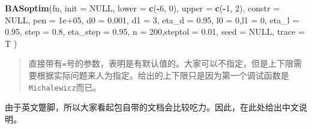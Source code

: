 \documentclass[]{ctexbook}
\newenvironment{Shaded}{\begin{snugshade}}{\end{snugshade}}
\newcommand{\KeywordTok}[1]{\textcolor[rgb]{0.13,0.29,0.53}{\textbf{#1}}}
\newcommand{\DataTypeTok}[1]{\textcolor[rgb]{0.13,0.29,0.53}{#1}}
\newcommand{\DecValTok}[1]{\textcolor[rgb]{0.00,0.00,0.81}{#1}}
\newcommand{\FloatTok}[1]{\textcolor[rgb]{0.00,0.00,0.81}{#1}}
\newcommand{\OtherTok}[1]{\textcolor[rgb]{0.56,0.35,0.01}{#1}}
\newcommand{\OperatorTok}[1]{\textcolor[rgb]{0.81,0.36,0.00}{\textbf{#1}}}
\newcommand{\NormalTok}[1]{#1}
\begin{document}
\begin{Shaded}
\begin{Highlighting}[]
\KeywordTok{BASoptim}\NormalTok{(fn, }
         \DataTypeTok{init =} \OtherTok{NULL}\NormalTok{, }
         \DataTypeTok{lower =} \KeywordTok{c}\NormalTok{(}\OperatorTok{-}\DecValTok{6}\NormalTok{, }\DecValTok{0}\NormalTok{), }\DataTypeTok{upper =} \KeywordTok{c}\NormalTok{(}\OperatorTok{-}\DecValTok{1}\NormalTok{, }\DecValTok{2}\NormalTok{),}
         \DataTypeTok{constr =} \OtherTok{NULL}\NormalTok{, }\DataTypeTok{pen =} \FloatTok{1e+05}\NormalTok{,}
         \DataTypeTok{d0 =} \FloatTok{0.001}\NormalTok{, }\DataTypeTok{d1 =} \DecValTok{3}\NormalTok{, }\DataTypeTok{eta_d =} \FloatTok{0.95}\NormalTok{, }
         \DataTypeTok{l0 =} \DecValTok{0}\NormalTok{,}\DataTypeTok{l1 =} \DecValTok{0}\NormalTok{, }\DataTypeTok{eta_l =} \FloatTok{0.95}\NormalTok{, }
         \DataTypeTok{step =} \FloatTok{0.8}\NormalTok{, }\DataTypeTok{eta_step =} \FloatTok{0.95}\NormalTok{, }
         \DataTypeTok{n =} \DecValTok{200}\NormalTok{,}\DataTypeTok{steptol =} \FloatTok{0.01}\NormalTok{, }
         \DataTypeTok{seed =} \OtherTok{NULL}\NormalTok{, }\DataTypeTok{trace =}\NormalTok{ T )}
\end{Highlighting}
\end{Shaded}

\begin{quote}
直接带有\texttt{=}号的参数，表明是有默认值的。大家可以不指定，但是上下限需要根据实际问题来人为指定。给出的上下限只是因为第一个调试函数是\texttt{Michalewicz}而已。
\end{quote}

由于英文蹩脚，所以大家看起包自带的文档会比较吃力。因此，在此处给出中文说明。
\end{document}
